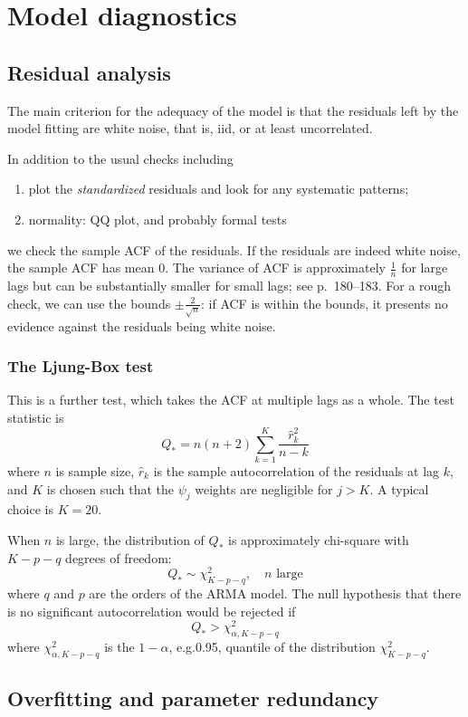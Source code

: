 \documentclass[12pt]{article}
\begin{document}
\section{Model diagnostics}

\subsection{Residual analysis}

The main criterion for the adequacy of the model is that
the residuals left by the model fitting are white noise,
that is, iid, or at least uncorrelated.

In addition to the usual checks including
\begin{enumerate}
\item plot the \emph{standardized} residuals and look for any systematic patterns;
\item normality: QQ plot, and probably formal tests
\end{enumerate}
we check the sample ACF of the residuals.
If the residuals are indeed white noise,
the sample ACF has mean 0.
The variance of ACF is approximately $\frac{1}{n}$ for large lags
but can be substantially smaller for small lags;
see p.~180--183.
For a rough check, we can use the bounds $\pm \frac{2}{\sqrt{n}}$:
if ACF is within the bounds, it presents no evidence against the
residuals being white noise.

\subsubsection{The Ljung-Box test}

This is a further test, which takes the ACF at multiple lags as a whole.
The test statistic is
\[
Q_* = n(n+2) \sum_{k=1}^K \frac{\hat{r}_k^2}{n-k}
\]
where $n$ is sample size, $\hat{r}_k$ is the sample autocorrelation of
the residuals at lag $k$, and $K$ is chosen such that
the $\psi_j$ weights are negligible for $j > K$.
A typical choice is $K=20$.

When $n$ is large, the distribution of $Q_*$ is approximately chi-square
with $K-p-q$ degrees of freedom:
\[
Q_* \sim \chi^2_{K-p-q},
\quad \text{$n$ large}
\]
where $q$ and $p$ are the orders of the ARMA model.
The null hypothesis that there is no significant autocorrelation would
be rejected if
\[
Q_* > \chi^2_{\alpha, K-p-q}
\]
where $\chi^2_{\alpha, K-p-q}$ is the $1-\alpha$, e.g.\@ 0.95,
quantile of the distribution $\chi_{K-p-q}^2$.

\subsection{Overfitting and parameter redundancy}
\end{document}
